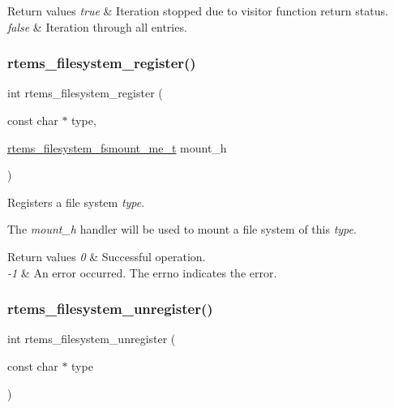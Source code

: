 \begin{DoxyRetVals}{Return values}
{\em true} & Iteration stopped due to visitor function return status. \\
\hline
{\em false} & Iteration through all entries. \\
\hline
\end{DoxyRetVals}
\mbox{\label{group__FileSystemTypesAndMount_gaac7f1c7fe78f3acc145272809cef62a2}} 
\subsubsection{\texorpdfstring{rtems\_filesystem\_register()}{rtems\_filesystem\_register()}}
{\footnotesize\ttfamily int rtems\+\_\+filesystem\+\_\+register (\begin{DoxyParamCaption}\item[{const char $\ast$}]{type,  }\item[{\mbox{\hyperlink{group__LibIOFSOps_gab86f790d75005100fc4d847f7cdc8aef}{rtems\+\_\+filesystem\+\_\+fsmount\+\_\+me\+\_\+t}}}]{mount\+\_\+h }\end{DoxyParamCaption})}



Registers a file system {\itshape type}. 

The {\itshape mount\+\_\+h} handler will be used to mount a file system of this {\itshape type}.


\begin{DoxyRetVals}{Return values}
{\em 0} & Successful operation. \\
\hline
{\em -\/1} & An error occurred. The {\ttfamily errno} indicates the error. \\
\hline
\end{DoxyRetVals}
\mbox{\label{group__FileSystemTypesAndMount_ga4e658123f1059ea0684904df0ddb8d67}} 
\subsubsection{\texorpdfstring{rtems\_filesystem\_unregister()}{rtems\_filesystem\_unregister()}}
{\footnotesize\ttfamily int rtems\+\_\+filesystem\+\_\+unregister (\begin{DoxyParamCaption}\item[{const char $\ast$}]{type }\end{DoxyParamCaption})}



